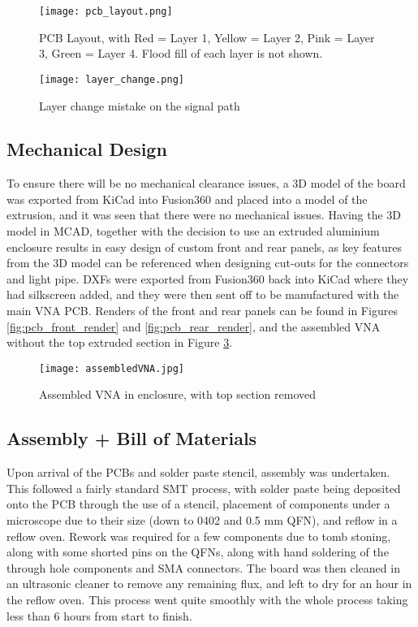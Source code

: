 \begin{landscape}
	\begin{figure}
		\centering
		\texttt{[image: pcb\_layout.png]}
		\caption{PCB Layout, with Red = Layer 1, Yellow = Layer 2, Pink = Layer 3, Green = Layer 4. Flood fill of each layer is not shown.}
		\label{fig:pcb_layout}
	\end{figure}
\end{landscape}

\begin{figure}[H]
	\centering
	\texttt{[image: layer\_change.png]}
	\caption{Layer change mistake on the signal path}
	\label{fig:pcb_layer_change}
\end{figure}

\subsection{Mechanical Design}
To ensure there will be no mechanical clearance issues, a 3D model of the board was exported from KiCad into Fusion360 and placed into a model of the extrusion, and it was seen that there were no mechanical issues. Having the 3D model in MCAD, together with the decision to use an extruded aluminium enclosure results in easy design of custom front and rear panels, as key features from the 3D model can be referenced when designing cut-outs for the connectors and light pipe. DXFs were exported from Fusion360 back into KiCad where they had silkscreen added, and they were then sent off to be manufactured with the main VNA PCB. Renders of the front and rear panels can be found in Figures \ref{fig:pcb_front_render} and \ref{fig:pcb_rear_render}, and the assembled VNA without the top extruded section in Figure \ref{fig:pcb_assembled}.

\begin{figure}[H]
	\centering
	\texttt{[image: assembledVNA.jpg]}
	\caption{Assembled VNA in enclosure, with top section removed}
	\label{fig:pcb_assembled}
\end{figure}

\subsection{Assembly + Bill of Materials}
Upon arrival of the PCBs and solder paste stencil, assembly was undertaken. This followed a fairly standard SMT process, with solder paste being deposited onto the PCB through the use of a stencil, placement of components under a microscope due to their size (down to 0402 and 0.5 mm QFN), and reflow in a reflow oven. Rework was required for a few components due to tomb stoning, along with some shorted pins on the QFNs, along with hand soldering of the through hole components and SMA connectors. The board was then cleaned in an ultrasonic cleaner to remove any remaining flux, and left to dry for an hour in the reflow oven. This process went quite smoothly with the whole process taking less than 6 hours from start to finish. 


